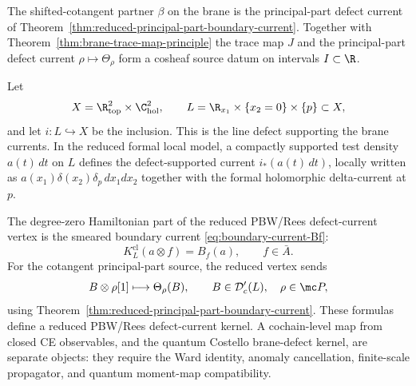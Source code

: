 \documentclass[11pt]{memoir}
\begin{document}
The shifted-cotangent partner $\beta$ on the brane is the
principal-part defect current of
Theorem~\ref{thm:reduced-principal-part-boundary-current}.  Together
with Theorem~\ref{thm:brane-trace-map-principle} the trace map \(J\)
and the principal-part defect current
\(\rho\mapsto\Theta_\rho\) form a cosheaf source datum on intervals
\(I\subset\R\).

\begin{constr}\label{constr:reduced-line-defect-current-kernel}
  Let
  $$X=\R^2_{\mathrm{top}}\times\C^2_{\mathrm{hol}},\qquad
    L=\R_{x_1}\times\{x_2=0\}\times\{p\}\subset X,$$
  and let $i:L\hookrightarrow X$ be the inclusion. This is the line
  defect supporting the brane currents. In the reduced formal local model, a compactly
  supported test density $a(t)\,dt$ on $L$ defines the defect-supported current $i_*(a(t)\,dt)$,
  locally written as $a(x_1)\delta(x_2)\delta_p\,dx_1dx_2$ together with the
  formal holomorphic delta-current at $p$.

  The degree-zero Hamiltonian part of the reduced PBW/Rees defect-current
  vertex is the smeared boundary current
  \eqref{eq:boundary-current-Bf}:
  $$K_L^{\mathrm{cl}}(a\otimes f)=B_f(a),
    \qquad f\in\bar A.$$
  For the cotangent principal-part source, the reduced vertex sends
  $$B\otimes\rho[1]\longmapsto\Theta_\rho(B),\qquad
    B\in\mathcal D'_c(L),\quad \rho\in\mc P,$$
  using Theorem~\ref{thm:reduced-principal-part-boundary-current}. These
  formulas define a reduced PBW/Rees defect-current kernel. A
  cochain-level map from closed CE observables, and the quantum Costello
  brane-defect kernel, are separate objects: they require
  the Ward identity, anomaly cancellation, finite-scale propagator, and
  quantum moment-map compatibility.
\end{constr}
\end{document}
